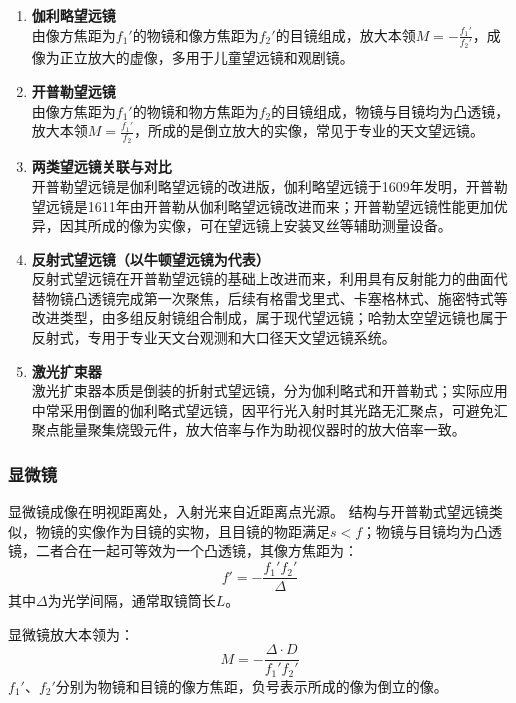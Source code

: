 \documentclass{article}
\begin{document}
	\begin{enumerate}[label=\arabic*., leftmargin=2em, itemsep=0.8em]
		\item \textbf{伽利略望远镜} \\
		由像方焦距为$f_1'$的物镜和像方焦距为$f_2'$的目镜组成，放大本领$M = -\frac{f_1'}{f_2'}$，成像为正立放大的虚像，多用于儿童望远镜和观剧镜。
		
		\item \textbf{开普勒望远镜} \\
		由像方焦距为$f_1'$的物镜和物方焦距为$f_2$的目镜组成，物镜与目镜均为凸透镜，放大本领$M = \frac{f_1'}{f_2}$，所成的是倒立放大的实像，常见于专业的天文望远镜。
		
		\item \textbf{两类望远镜关联与对比} \\
		开普勒望远镜是伽利略望远镜的改进版，伽利略望远镜于1609年发明，开普勒望远镜是1611年由开普勒从伽利略望远镜改进而来；开普勒望远镜性能更加优异，因其所成的像为实像，可在望远镜上安装叉丝等辅助测量设备。
		
		\item \textbf{反射式望远镜（以牛顿望远镜为代表）} \\
		反射式望远镜在开普勒望远镜的基础上改进而来，利用具有反射能力的曲面代替物镜凸透镜完成第一次聚焦，后续有格雷戈里式、卡塞格林式、施密特式等改进类型，由多组反射镜组合制成，属于现代望远镜；哈勃太空望远镜也属于反射式，专用于专业天文台观测和大口径天文望远镜系统。
		
		\item \textbf{激光扩束器} \\
		激光扩束器本质是倒装的折射式望远镜，分为伽利略式和开普勒式；实际应用中常采用倒置的伽利略式望远镜，因平行光入射时其光路无汇聚点，可避免汇聚点能量聚集烧毁元件，放大倍率与作为助视仪器时的放大倍率一致。
	\end{enumerate}
	
	\subsubsection{显微镜}
	显微镜成像在明视距离处，入射光来自近距离点光源。
	结构与开普勒式望远镜类似，物镜的实像作为目镜的实物，且目镜的物距满足$s<f$；物镜与目镜均为凸透镜，二者合在一起可等效为一个凸透镜，其像方焦距为：
	\[
	f'=-\frac{f_1'f_2'}{\Delta}
	\]
	其中$\Delta$为光学间隔，通常取镜筒长$L$。
	
	显微镜放大本领为：
	\[
	M=-\frac{\Delta \cdot D}{f_1'f_2'}
	\]
	$f_1'$、$f_2'$分别为物镜和目镜的像方焦距，负号表示所成的像为倒立的像。
	
\end{document}
